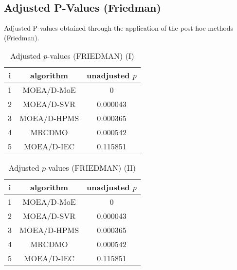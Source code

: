 \documentclass[a4paper,10pt]{article}
\begin{document}
\begin{landscape}
\section{Adjusted P-Values (Friedman)}


Adjusted P-values obtained through the application of the post hoc methods (Friedman).

\begin{table}[!htp]
\centering\small
\begin{tabular}{ccc}
i&algorithm&unadjusted $p$\\
\hline1& MOEA/D-MoE&0\\2& MOEA/D-SVR&0.000043\\3&MOEA/D-HPMS&0.000365\\4& MRCDMO&0.000542\\5& MOEA/D-IEC&0.115851\\\hline
\end{tabular}
\caption{Adjusted $p$-values (FRIEDMAN) (I)}
\end{table}
\begin{table}[!htp]
\centering\small
\begin{tabular}{ccc}
i&algorithm&unadjusted $p$\\
\hline1& MOEA/D-MoE&0\\2& MOEA/D-SVR&0.000043\\3&MOEA/D-HPMS&0.000365\\4& MRCDMO&0.000542\\5& MOEA/D-IEC&0.115851\\\hline
\end{tabular}
\caption{Adjusted $p$-values (FRIEDMAN) (II)}
\end{table}

\newpage
\end{landscape}
\end{document}
